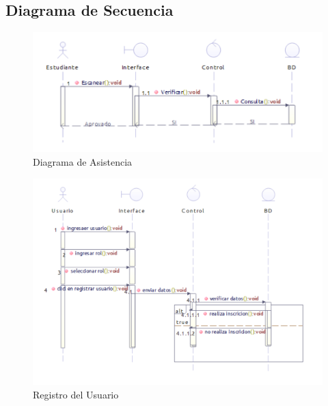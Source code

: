 \subsection{Diagrama de Secuencia}
	\begin{figure}[th!]
		\centering
		\includegraphics[width=0.9\linewidth]{uml/Asistencia}
		\caption{Diagrama de Asistencia}
		\label{fig:Diagrama de Asistencia}
	\end{figure}

	\begin{figure}[th!]
	\centering
	\includegraphics[width=1.1\linewidth]{uml/RegUsu}
	\caption{Registro del Usuario}
	\label{fig:Registro del Usuario}
	\end{figure}

